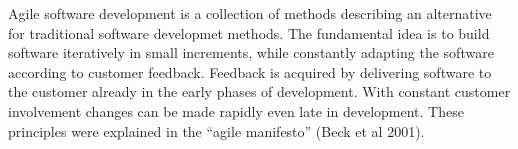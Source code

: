 Agile software development is a collection of methods describing an
alternative for traditional software developmet methods. The fundamental
idea is to build software iteratively in small increments, while
constantly adapting the software according to customer feedback.
Feedback is acquired by delivering software to the customer already in
the early phases of development. With constant customer involvement
changes can be made rapidly even late in development. These principles were
explained in the ``agile manifesto'' (Beck et al 2001).


